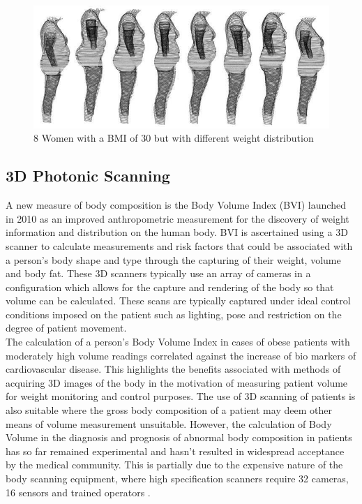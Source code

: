 \begin{figure}[t]
\label{bmi30}
	\centering
	\includegraphics[scale=0.6]{images/bmi30women.JPG}
	\caption{8 Women with a BMI of 30 but with different weight distribution}
\end{figure}

\subsection{3D Photonic Scanning}

A new measure of body composition is the Body Volume Index (BVI) launched in 2010 as an improved anthropometric measurement for the discovery of weight information and distribution on the human body. BVI is ascertained using a 3D scanner to calculate measurements and risk factors that could be associated with a person's body shape and type through the capturing of their weight, volume and body fat. These 3D scanners typically use an array of cameras in a configuration which allows for the capture and rendering of the body so that volume can be calculated. These scans are typically captured under ideal control conditions imposed on the patient such as lighting, pose and restriction on the degree of patient movement. \\ 

The calculation of a person's Body Volume Index in cases of obese patients with moderately high volume readings correlated against the increase of bio markers of cardiovascular disease. This  highlights the benefits associated with methods of acquiring 3D images of the body in the motivation of measuring patient volume for weight monitoring and control purposes. The use of 3D scanning of patients is also suitable where the gross body composition of a patient may deem other means of volume measurement unsuitable. However, the calculation of Body Volume in the diagnosis and prognosis of abnormal body composition in patients has so far remained experimental and hasn't resulted in widespread acceptance by the medical community. This is partially due to the expensive nature of the body scanning equipment, where high specification scanners require 32 cameras, 16 sensors and trained operators \cite{BVIAcceptance}. \\

